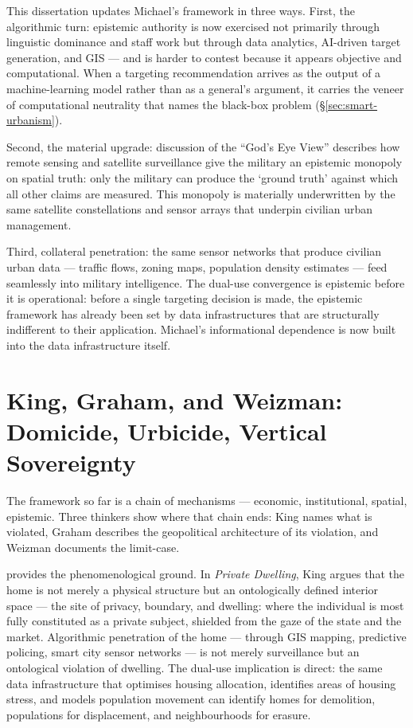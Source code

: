 \documentclass[12pt,a4paper,twoside]{report}
\begin{document}
This dissertation updates Michael's framework in three ways. First, the algorithmic turn: epistemic authority is now exercised not primarily through linguistic dominance and staff work but through data analytics, AI-driven target generation, and GIS — and is harder to contest because it appears objective and computational. When a targeting recommendation arrives as the output of a machine-learning model rather than as a general's argument, it carries the veneer of computational neutrality that \textcite{pasquale2015} names the black-box problem (§\ref{sec:smart-urbanism}).

Second, the material upgrade: \textcite[p.~269]{sadowski2026} discussion of the ``God's Eye View'' \parencite{haraway1988} describes how remote sensing and satellite surveillance give the military an epistemic monopoly on spatial truth: only the military can produce the `ground truth' against which all other claims are measured. This monopoly is materially underwritten by the same satellite constellations and sensor arrays that underpin civilian urban management.

Third, collateral penetration: the same sensor networks that produce civilian urban data — traffic flows, zoning maps, population density estimates — feed seamlessly into military intelligence. The dual-use convergence is epistemic before it is operational: before a single targeting decision is made, the epistemic framework has already been set by data infrastructures that are structurally indifferent to their application. Michael's informational dependence is now built into the data infrastructure itself.

\section{King, Graham, and Weizman: Domicide, Urbicide, Vertical Sovereignty}
\label{sec:king-graham-weizman}

The framework so far is a chain of mechanisms — economic, institutional, spatial, epistemic. Three thinkers show where that chain ends: King names what is violated, Graham describes the geopolitical architecture of its violation, and Weizman documents the limit-case.

\textcite{king2004} provides the phenomenological ground. In \textit{Private Dwelling}, King argues that the home is not merely a physical structure but an ontologically defined interior space — the site of privacy, boundary, and dwelling: where the individual is most fully constituted as a private subject, shielded from the gaze of the state and the market. Algorithmic penetration of the home — through GIS mapping, predictive policing, smart city sensor networks — is not merely surveillance but an ontological violation of dwelling. The dual-use implication is direct: the same data infrastructure that optimises housing allocation, identifies areas of housing stress, and models population movement can identify homes for demolition, populations for displacement, and neighbourhoods for erasure.
\end{document}
